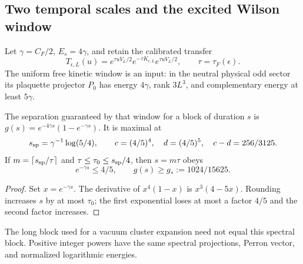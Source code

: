 \subsection{Two temporal scales and the excited Wilson window}
\label{sec:wilson-excited-operator}
Let $\gamma=C_F/2$, $E_s=4\gamma$, and retain the calibrated transfer
\[
 T_{\epsilon,L}(u)=e^{\tau uV_L/2}e^{-\tau K_{\epsilon,L}}e^{\tau uV_L/2},
 \qquad \tau=\tau_F(\epsilon).
\]
The uniform free kinetic window is an input: in the neutral physical odd
sector its plaquette projector $P_0$ has energy $4\gamma$, rank $3L^3$,
and complementary energy at least $5\gamma$.

\begin{proposition}
The separation guaranteed by that window for a block of duration $s$ is
$g(s)=e^{-4\gamma s}(1-e^{-\gamma s})$. It is maximal at
\[
 s_{\rm sp}=\gamma^{-1}\log(5/4),\qquad
 c=(4/5)^4,\quad d=(4/5)^5,\quad c-d=256/3125.
\]
If $m=\lceil s_{\rm sp}/\tau\rceil$ and
$\tau\le\tau_0\le s_{\rm sp}/4$, then $s=m\tau$ obeys
\[
 e^{-\gamma s}\le4/5,\qquad g(s)\ge g_*:=1024/15625.
\]
\end{proposition}
\begin{proof}
Set $x=e^{-\gamma s}$. The derivative of $x^4(1-x)$ is $x^3(4-5x)$.
Rounding increases $s$ by at most $\tau_0$; the first exponential loses
at most a factor $4/5$ and the second factor increases.
\end{proof}
The long block used for a vacuum cluster expansion need not equal this
spectral block. Positive integer powers have the same spectral projections,
Perron vector, and normalized logarithmic energies.

